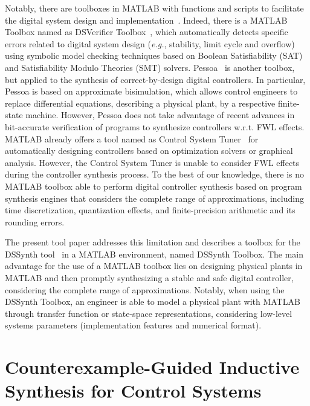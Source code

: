 \documentclass[10pt,conference]{IEEEtran}
\newcommand\tool{{DSSynth Toolbox}\xspace}
\begin{document}
Notably, there are toolboxes in MATLAB with functions and scripts to facilitate the 
digital system design and implementation~\cite{matlab-toolbox}. Indeed, there is a MATLAB 
Toolbox named as DSVerifier Toolbox~\cite{issta2017,DBLP:journals/tc/BessaIPCF17,DBLP:journals/dafes/BessaICF16}, which automatically detects 
specific errors related to digital system design ({\it e.g.}, stability, limit cycle and overflow) 
using symbolic model checking techniques based on Boolean Satisfiability (SAT) and 
Satisfiability Modulo Theories (SMT) solvers. Pessoa~\cite{mazo2010pessoa} is another 
toolbox, but applied to the synthesis of correct-by-design digital controllers. 
In particular, Pessoa is based on approximate bisimulation, which allows control engineers to replace differential equations, 
describing a physical plant, by a respective finite-state machine. However, Pessoa does not take advantage of
recent advances in bit-accurate verification of programs to synthesize controllers w.r.t. FWL effects. MATLAB already offers a tool 
named as Control System Tuner~\cite{autotuner} for automatically designing controllers based on optimization solvers or graphical analysis. 
However, the Control System Tuner is unable to consider FWL effects during the controller synthesis process.
To the best of our knowledge, there is no MATLAB toolbox able to perform digital controller synthesis based on 
program synthesis engines that considers the complete range of approximations, including time discretization, 
quantization effects, and finite-precision arithmetic and its rounding errors. 

The present tool paper addresses this limitation and describes a toolbox for the DSSynth tool~\cite{abate2017, abatecav2017} 
in a MATLAB environment, named \tool. The main advantage for the use of a MATLAB toolbox 
lies on designing physical plants in MATLAB and then promptly synthesizing a stable and safe digital controller,
considering the complete range of approximations. 
Notably, when using the \tool, an engineer is able to model a physical plant with MATLAB
through transfer function or state-space representations, considering low-level systems parameters 
(implementation features and numerical format).

\section{Counterexample-Guided Inductive Synthesis for Control Systems}
\label{sec:CEGIS}
\end{document}
